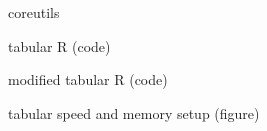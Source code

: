 \begin{frame}
		coreutils
\end{frame}

\begin{frame}
		tabular R (code)
\end{frame}

\begin{frame}
		modified tabular R (code)
\end{frame}

\begin{frame}
		tabular speed and memory setup (figure)
\end{frame}
